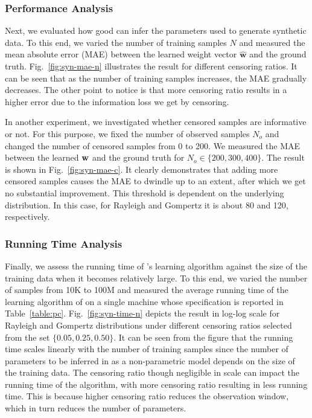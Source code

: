 \subsubsection{Performance Analysis}
Next, we evaluated how good \npglm can infer the parameters used to generate synthetic data. To this end, we varied the number of training samples $N$ and measured the mean absolute error (MAE) between the learned weight vector $\hat{\mathbf{w}}$ and the ground truth. Fig.~\ref{fig:syn-mae-n} illustrates the result for different censoring ratios. It can be seen that as the number of training samples increases, the MAE gradually decreases. The other point to notice is that more censoring ratio results in a higher error due to the information loss we get by censoring.

In another experiment, we investigated whether censored samples are informative or not. For this purpose, we fixed the number of observed samples $N_o$ and changed the number of censored samples from 0 to 200. We measured the MAE between the learned $\mathbf{w}$ and the ground truth for $N_o\in\{200,300,400\}$. The result is shown in Fig.~\ref{fig:syn-mae-c}. It clearly demonstrates that adding more censored samples causes the MAE to dwindle up to an extent, after which we get no substantial improvement. This threshold is dependent on the underlying distribution. In this case, for Rayleigh and Gompertz it is about 80 and 120, respectively.


\subsubsection{Running Time Analysis}    
Finally, we assess the running time of \npglm's learning algorithm against the size of the training data when it becomes relatively large. To this end, we varied the number of samples from 10K to 100M and measured the average running time of the learning algorithm of \npglm on a single machine whose specification is reported in Table~\ref{table:pc}. Fig.~\ref*{fig:syn-time-n} depicts the result in log-log scale for Rayleigh and Gompertz distributions under different censoring ratios selected from the set $\{0.05, 0.25, 0.50\}$. It can be seen from the figure that the running time scales linearly with the number of training samples since the number of parameters to be inferred in \npglm as a non-parametric model depends on the size of the training data. The censoring ratio though negligible in scale can impact the running time of the algorithm, with more censoring ratio resulting in less running time. This is because higher censoring ratio reduces the observation window, which in turn reduces the number of parameters.

